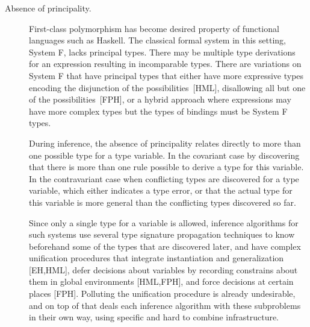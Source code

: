 \documentclass[preprint,natbib]{sigplanconf}
\begin{document}
  \begin{description}
  \item[Absence of principality.]
    First-class polymorphism has become desired property of functional languages
    such as Haskell. The classical formal system in this setting, System F,
    lacks principal types. There may be multiple type derivations for an
    expression resulting in incomparable types. There are variations on System F
    that have principal types that either have more expressive types encoding
    the disjunction of the possibilities~[HML], disallowing all but one of the
    possibilities~[FPH], or a hybrid approach where expressions may have more
    complex types but the types of bindings must be System F types.

    During inference, the absence of principality relates directly to
    more than one possible type for a type variable. In the covariant case by
    discovering that there is more than one rule possible to derive a type for
    this variable. In the contravariant case when conflicting types are
    discovered for a type variable, which either indicates a type error, or
    that the actual type for this variable is more general than the conflicting
    types discovered so far.

    Since only a single type for a variable is allowed, inference algorithms
    for such systems use several type signature propagation techniques to know
    beforehand some of the types that are discovered later, and have complex
    unification procedures that integrate instantiation and generalization
    [EH,HML], defer decisions about variables by recording constrains about them
    in global environments [HML,FPH], and force decisions at certain places
    [FPH]. Polluting the unification procedure is already undesirable, and on
    top of that deals each inference algorithm with these subproblems in their
    own way, using specific and hard to combine infrastructure.


\end{description}
\end{document}
